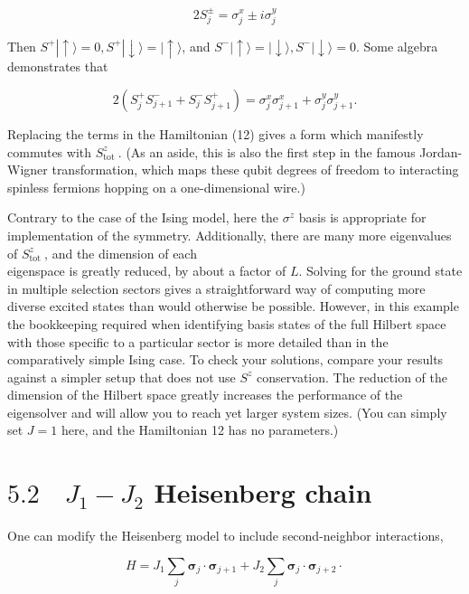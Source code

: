 \documentclass[12pt]{article}
\begin{document}
\begin{equation*}
2 S_{j}^{ \pm}=\sigma_{j}^{x} \pm i \sigma_{j}^{y} \tag{13}
\end{equation*}


Then $S^{+}|\uparrow\rangle=0, S^{+}|\downarrow\rangle=|\uparrow\rangle$, and $S^{-}|\uparrow\rangle=|\downarrow\rangle, S^{-}|\downarrow\rangle=0$. Some algebra demonstrates that


\begin{equation*}
2\left(S_{j}^{+} S_{j+1}^{-}+S_{j}^{-} S_{j+1}^{+}\right)=\sigma_{j}^{x} \sigma_{j+1}^{x}+\sigma_{j}^{y} \sigma_{j+1}^{y} . \tag{14}
\end{equation*}


Replacing the terms in the Hamiltonian (12) gives a form which manifestly commutes with $S_{\text {tot }}^{z}$. (As an aside, this is also the first step in the famous Jordan-Wigner transformation, which maps these qubit degrees of freedom to interacting spinless fermions hopping on a one-dimensional wire.)

Contrary to the case of the Ising model, here the $\sigma^{z}$ basis is appropriate for implementation of the symmetry. Additionally, there are many more eigenvalues of $S_{\text {tot }}^{z}$, and the dimension of each\\
eigenspace is greatly reduced, by about a factor of $L$. Solving for the ground state in multiple selection sectors gives a straightforward way of computing more diverse excited states than would otherwise be possible. However, in this example the bookkeeping required when identifying basis states of the full Hilbert space with those specific to a particular sector is more detailed than in the comparatively simple Ising case. To check your solutions, compare your results against a simpler setup that does not use $S^{z}$ conservation. The reduction of the dimension of the Hilbert space greatly increases the performance of the eigensolver and will allow you to reach yet larger system sizes. (You can simply set $J=1$ here, and the Hamiltonian 12 has no parameters.)

\section*{$5.2 \quad J_{1}-J_{2}$ Heisenberg chain}
One can modify the Heisenberg model to include second-neighbor interactions,


\begin{equation*}
H=J_{1} \sum_{j} \boldsymbol{\sigma}_{j} \cdot \boldsymbol{\sigma}_{j+1}+J_{2} \sum_{j} \boldsymbol{\sigma}_{j} \cdot \boldsymbol{\sigma}_{j+2} \cdot \tag{15}
\end{equation*}
\end{document}
